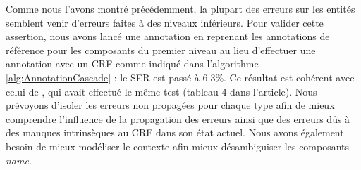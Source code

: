 \documentclass[PhD-Yoann-Dupont.tex]{subfiles}
\begin{document}
Comme nous l'avons montré précédemment, la plupart des erreurs sur les entités semblent venir d'erreurs faites à des niveaux inférieurs. Pour valider cette assertion, nous avons lancé une annotation en reprenant les annotations de référence pour les composants du premier niveau au lieu d'effectuer une annotation avec un CRF comme indiqué dans l'algorithme \ref{alg:AnnotationCascade} : le SER est passé à 6.3\%. Ce résultat est cohérent avec celui de \cite{Dinarelli2011}, qui avait effectué le même test (tableau 4 dans l'article). Nous prévoyons d'isoler les erreurs non propagées pour chaque type afin de mieux comprendre l'influence de la propagation des erreurs ainsi que des erreurs dûs à des manques intrinsèques au CRF dans son état actuel. Nous avons également besoin de mieux modéliser le contexte afin mieux désambiguiser les composants \emph{name}.
\end{document}
